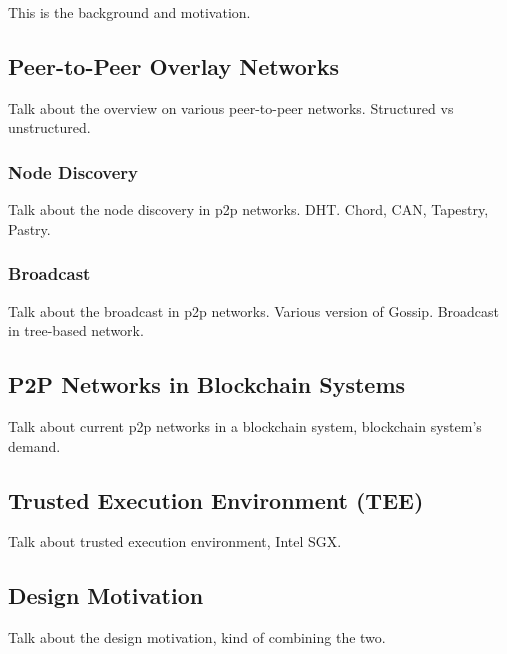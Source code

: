 This is the background and motivation.

\subsection{Peer-to-Peer Overlay Networks}

Talk about the overview on various peer-to-peer networks. Structured vs unstructured.

\subsubsection{Node Discovery}

Talk about the node discovery in p2p networks. DHT. Chord, CAN, Tapestry, Pastry.

\subsubsection{Broadcast}

Talk about the broadcast in p2p networks. Various version of Gossip. Broadcast in tree-based network.

\subsection{P2P Networks in Blockchain Systems}

Talk about current p2p networks in a blockchain system, blockchain system's demand.

\subsection{Trusted Execution Environment (TEE)}

Talk about trusted execution environment, Intel SGX.

\subsection{Design Motivation}

Talk about the design motivation, kind of combining the two.